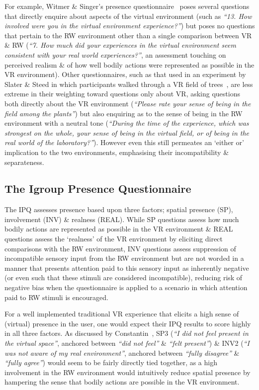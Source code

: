 For example, Witmer \& Singer's presence questionnaire~\cite{Witmer1998} poses several questions that directly enquire about aspects of the virtual environment (such as \textit{``13. How involved were you in the virtual environment experience?''}) but poses no questions that pertain to the RW environment other than a single comparison between VR \& RW (\textit{``7. How much did your experiences in the virtual environment seem consistent with your real world experiences?''}, an assessment touching on perceived realism \& of how well bodily actions were represented as possible in the VR environment). Other questionnaires, such as that used in an experiment by Slater \& Steed in which participants walked through a VR field of trees~\cite{Slater1998}, are less extreme in their weighting toward questions only about VR, asking questions both directly about the VR environment (\textit{``Please rate your sense of being in the field among the plants''}) but also enquiring as to the sense of being in the RW environment with a neutral tone (\textit{``During the time of the experience, which was strongest on the whole, your sense of being in the virtual field, or of being in the real world of the laboratory?''}). However even this still permeates an `either or' implication to the two environments, emphasising their incompatibility \& separateness.


\subsection{The Igroup Presence Questionnaire}
\label{igroup-presence-questionnaire-explanation}
The IPQ assesses presence based upon three factors; spatial presence (SP), involvement (INV) \& realness (REAL). While SP questions assess how much bodily actions are represented as possible in the VR environment \& REAL questions assess the `realness' of the VR environment by eliciting direct comparisons with the RW environment, INV questions assess suppression of incompatible sensory input from the RW environment but are not worded in a manner that presents attention paid to this sensory input as inherently negative (or even such that these stimuli are considered incompatible), reducing risk of negative bias when the questionnaire is applied to a scenario in which attention paid to RW stimuli is encouraged.

For a well implemented traditional VR experience that elicits a high sense of (virtual) presence in the user, one would expect their IPQ results to score highly in all three factors. As discussed by Constantin~\cite{Constantin2003a}, SP3 (\textit{``I did not feel present in the virtual space''}, anchored between \textit{``did not feel''} \& \textit{``felt present''}) \& INV2 (\textit{``I was not aware of my real environment''}, anchored between \textit{``fully disagree''} \& \textit{``fully agree''}) would seem to be fairly directly tied together, as a high involvement in the RW environment would intuitively reduce spatial presence by hampering the sense that bodily actions are possible in the VR environment.

